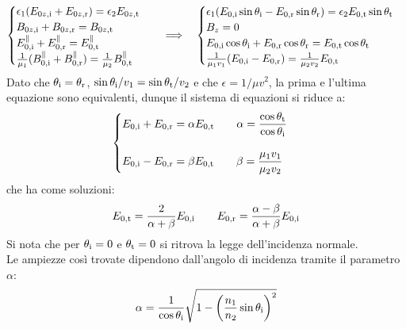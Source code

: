 \begin{equation}
	\begin{cases}
		\epsilon_1 (E_{0z,\text{i}} + E_{0z,\text{r}}) = \epsilon_2 E_{0z,\text{t}} \\ 
		B_{0z,\text{i}} + B_{0z,\text{r}} = B_{0z,\text{t}} \\ 
		E^{\parallel}_{0,\text{i}} + E^{\parallel}_{0,\text{r}} = E^{\parallel}_{0,\text{t}} \\ 
		\frac{1}{\mu_1}(B^{\parallel}_{0,\text{i}} + B^{\parallel}_{0,\text{r}}) = \frac{1}{\mu_2}B^{\parallel}_{0,\text{t}}
	\end{cases}
	\quad\Longrightarrow\quad
	\begin{cases}
		\epsilon_1 (E_{0,\text{i}}\sin\theta_{\text{i}} - E_{0,\text{r}}\sin\theta_{\text{r}}) = \epsilon_2 E_{0,\text{t}}\sin\theta_{\text{t}} \\ 
		B_z = 0 \\ 
		E_{0,\text{i}} \cos\theta_{\text{i}} + E_{0,\text{r}} \cos\theta_{\text{r}} = E_{0,\text{t}} \cos\theta_{\text{t}} \\ 
		\frac{1}{\mu_1 v_1}(E_{0,\text{i}} - E_{0,\text{r}}) = \frac{1}{\mu_2 v_2}E_{0,\text{t}}
	\end{cases}
	\label{eq:66}
\end{equation}
Dato che $ \theta_{\text{i}} = \theta_{\text{r}} $, $ \sin\theta_{\text{i}} / v_1 = \sin\theta_{\text{t}} / v_2 $ e che $ \epsilon = 1 / \mu v^2 $, la prima e l'ultima equazione sono equivalenti, dunque il sistema di equazioni si riduce a: 
\begin{equation}
	\begin{cases}
		E_{0,\text{i}} + E_{0,\text{r}} = \alpha E_{0,\text{t}} \qquad \alpha = \displaystyle\frac{\cos\theta_{\text{t}}}{\cos\theta_{\text{i}}} \\ 
		\\ 
		E_{0,\text{i}} - E_{0,\text{r}} = \beta E_{0,\text{t}} \qquad \beta = \displaystyle\frac{\mu_1 v_1}{\mu_2 v_2} \\ 
	\end{cases}
	\label{eq:67}
\end{equation}
che ha come soluzioni:
\begin{equation}
	E_{0,\text{t}} = \frac{2}{\alpha + \beta} E_{0,\text{i}} \qquad E_{0,\text{r}} = \frac{\alpha - \beta}{\alpha + \beta} E_{0,\text{i}}
	\label{eq:68}
\end{equation}
Si nota che per $ \theta_{\text{i}} = 0 $ e $ \theta_{\text{t}} = 0 $ si ritrova la legge dell'incidenza normale. \\ 
Le ampiezze così trovate dipendono dall'angolo di incidenza tramite il parametro $ \alpha $:
\begin{equation}
	\alpha = \frac{1}{\cos\theta_{\text{i}}} \sqrt{1 - \left(\frac{n_1}{n_2} \sin\theta_{\text{i}}\right)^2}
	\label{eq:69}
\end{equation}
